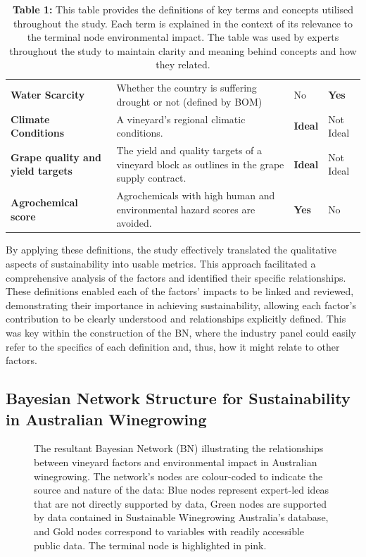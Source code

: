 \documentclass[10pt,letterpaper]{article}
\begin{document}
\begin{table}[h]
\begin{tabular}{@{}llll@{}}
    \textbf{Water Scarcity} & Whether the country is suffering drought or not (defined by BOM) & No & \textbf{Yes} \\
    \textbf{Climate Conditions} & A vineyard's regional climatic conditions. & \textbf{Ideal} & Not Ideal \\
    \textbf{Grape quality and yield targets} & The yield and quality targets of a vineyard block as outlines in the grape supply contract. & \textbf{Ideal} & Not Ideal \\
    \textbf{Agrochemical score} & Agrochemicals with high human and environmental hazard scores are avoided. & \textbf{Yes} & No \\ \bottomrule
    \end{tabular}
    \caption{\textbf{Table 1:} This table provides the definitions of key terms and concepts utilised throughout the study. Each term is explained in the context of its relevance to the terminal node environmental impact. The table was used by experts throughout the study to maintain clarity and meaning behind concepts and how they related.}\label{tab:definitions}
\end{table}

By applying these definitions, the study effectively translated the qualitative aspects of sustainability into usable metrics. This approach facilitated a comprehensive analysis of the factors and identified their specific relationships. These definitions enabled each of the factors' impacts to be linked and reviewed, demonstrating their importance in achieving sustainability, allowing each factor's contribution to be clearly understood and relationships explicitly defined. This was key within the construction of the BN, where the industry panel could easily refer to the specifics of each definition and, thus, how it might relate to other factors.

\subsection*{Bayesian Network Structure for Sustainability in Australian Winegrowing}

\begin{figure}[h!]
    \centering
    \caption{The resultant Bayesian Network (BN) illustrating the relationships between vineyard factors and environmental impact in Australian winegrowing. The network's nodes are colour-coded to indicate the source and nature of the data: Blue nodes represent expert-led ideas that are not directly supported by data, Green nodes are supported by data contained in Sustainable Winegrowing Australia's database, and Gold nodes correspond to variables with readily accessible public data. The terminal node is highlighted in pink.}\label{fig:generalBN}
\end{figure}
\end{document}

